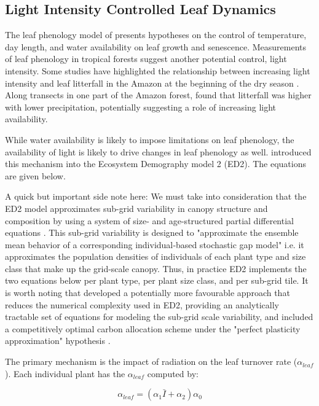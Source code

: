 \documentclass[twoside,10pt]{report}
\begin{document}
\subsection{Light Intensity Controlled Leaf Dynamics}

The leaf phenology model of \citet{Knorr2010} presents hypotheses on the control of temperature, day length, and water availability on leaf growth and senescence. Measurements of leaf phenology in tropical forests suggest another potential control, light intensity. Some studies have highlighted the relationship between increasing light intensity and leaf litterfall in the Amazon at the beginning of the dry season \citep{}. Along transects in one part of the Amazon forest, \citet{Rice2004} found that litterfall was higher with lower precipitation, potentially suggesting a role of increasing light availability. 

While water availability is likely to impose limitations on leaf phenology, the availability of light is likely to drive changes in leaf phenology as well. \citet{Kim2012} introduced this mechanism into the Ecosystem Demography model 2 (ED2). The equations are given below. 

A quick but important side note here: We must take into consideration that the ED2 model approximates sub-grid variability in canopy structure and composition by using a system of size- and age-structured partial differential equations \citep{Medvigy2009}. This sub-grid variability is designed to "approximate the ensemble mean behavior of a corresponding individual‐based stochastic gap model" \citep{Medvigy2009} i.e. it approximates the population densities of individuals of each plant type and size class that make up the grid-scale canopy. Thus, in practice ED2 implements the two equations below per plant type, per plant size class, and per sub-grid tile. It is worth noting that \citet{Weng2015} developed a potentially more favourable approach that reduces the numerical complexity used in ED2, providing an analytically tractable set of equations for modeling the sub-grid scale variability, and included a competitively optimal carbon allocation scheme under the "perfect plasticity approximation" hypothesis \citet{Franklin2020}. 

The primary mechanism is the impact of radiation on the leaf turnover rate ($\alpha_{leaf}$). Each individual plant has the $\alpha_{leaf}$ computed by:

\begin{equation}
\label{e:phenology_leafturnover_radiation}
    \alpha_{leaf} = (\alpha_1 \bar{I} + \alpha_2) \alpha_0
\end{equation}
\end{document}
